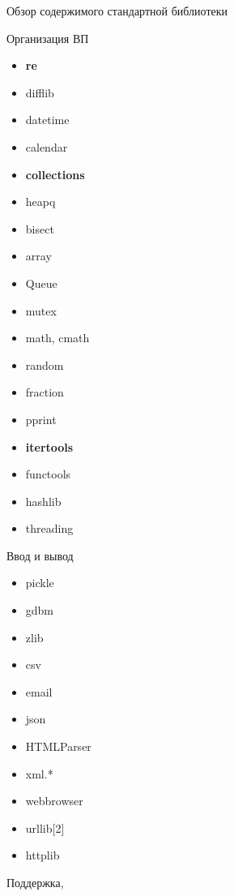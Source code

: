 \documentclass[hyperref={pdftex,unicode}]{beamer}
\begin{document}
\begin{frame}{Обзор содержимого стандартной библиотеки}
\footnotesize{  
  \begin{minipage}{0.5\linewidth}
    \centering Организация ВП
    \begin{multicols}{2}
    \begin{itemize}
    \item \textbf{re}
    \item difflib
    \item datetime
    \item calendar
    \item \textbf{collections}
    \item heapq
    \item bisect
    \item array
    \item Queue
    \item mutex
    \item math, cmath
    \item random
    \item fraction
    \item pprint
    \item \textbf{itertools}
    \item functools
    \item hashlib
    \item threading
    \end{itemize}    
  \end{multicols}
  \end{minipage}
  \hfill
  \begin{minipage}{0.25\linewidth}
    \centering Ввод и вывод
    \begin{itemize}
    \item pickle
    \item gdbm
    \item zlib
    \item csv
    \item email
    \item json
    \item HTMLParser
    \item xml.*
    \item webbrowser
    \item urllib[2]
    \item httplib
    \end{itemize}
  \end{minipage}
  \hfill
  \begin{minipage}{0.2\linewidth}
    \centering Поддержка, \\

\end{minipage}}
\end{frame}
\end{document}
